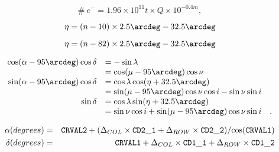 \documentclass[preprint,graphicx]{aastex}
\begin{document}
\pagestyle{empty}
{\newpage\clearpage\samepage
\begin{equation}\#\ e^- = 1.96 \times 10^{11} t \times Q \times 10^{-0.4 m},
\end{equation}}\hbox{}\vfil

{\newpage\clearpage\samepage
\begin{equation}\eta = (n-10) \times 2.5\arcdeg - 32.5\arcdeg
\end{equation}}\hbox{}\vfil

{\newpage\clearpage\samepage
\begin{equation}\eta = (n-82) \times 2.5\arcdeg - 32.5\arcdeg
\end{equation}}\hbox{}\vfil

{\newpage\clearpage\samepage
\begin{eqnarray}\begin{array}{rl}
  \cos(\alpha-95\arcdeg)\cos\delta & = -\sin\lambda \\ 
  & = \cos(\mu-95\arcdeg)\cos\nu \nonumber\\ 
  \sin(\alpha-95\arcdeg)\cos\delta & = \cos\lambda\cos(\eta+32.5\arcdeg) \nonumber\\ 
  & = \sin(\mu-95\arcdeg)\cos\nu\cos i - \sin\nu\sin i \nonumber\\ 
  \sin\delta & = \cos\lambda\sin(\eta+32.5\arcdeg) \nonumber\\ 
  & = \sin\nu\cos i + \sin(\mu-95\arcdeg)\cos\nu\sin i \quad .\\ 
\end{array}
\end{eqnarray}}\hbox{}\vfil

{\newpage\clearpage\samepage
\begin{eqnarray}\alpha (degrees) &=& {\tt CRVAL2} + ({{\Delta}_{COL}} \times {\tt CD2\_1} + {{\Delta}_{ROW}} \times {\tt CD2\_2})/{\cos}({\tt CRVAL1}) \\ 
\delta (degrees) &=& {\tt CRVAL1} + {{\Delta}_{COL}} \times {\tt CD1\_1} + {{\Delta}_{ROW}} \times {\tt CD1\_2} 
\end{eqnarray}}\hbox{}\vfil
\end{document}
